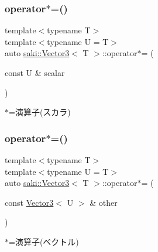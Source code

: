 \subsubsection{\texorpdfstring{operator$\ast$=()}{operator*=()}\hspace{0.1cm}{\footnotesize\ttfamily [1/2]}}
{\footnotesize\ttfamily template$<$typename T$>$ \\
template$<$typename U  = T$>$ \\
auto \mbox{\hyperlink{classsaki_1_1_vector3}{saki\+::\+Vector3}}$<$ T $>$\+::operator$\ast$= (\begin{DoxyParamCaption}\item[{const U \&}]{scalar }\end{DoxyParamCaption})\hspace{0.3cm}{\ttfamily [inline]}}



$\ast$=演算子(スカラ) 

\mbox{\label{classsaki_1_1_vector3_a7c68761dd40e55adf0dd8373c2b0e1a7}} 
\subsubsection{\texorpdfstring{operator$\ast$=()}{operator*=()}\hspace{0.1cm}{\footnotesize\ttfamily [2/2]}}
{\footnotesize\ttfamily template$<$typename T$>$ \\
template$<$typename U  = T$>$ \\
auto \mbox{\hyperlink{classsaki_1_1_vector3}{saki\+::\+Vector3}}$<$ T $>$\+::operator$\ast$= (\begin{DoxyParamCaption}\item[{const \mbox{\hyperlink{classsaki_1_1_vector3}{Vector3}}$<$ U $>$ \&}]{other }\end{DoxyParamCaption})\hspace{0.3cm}{\ttfamily [inline]}}



$\ast$=演算子(ベクトル) 

\mbox{\label{classsaki_1_1_vector3_a9aeb4f3478e477c4ffb6bc98fcc78574}} 
